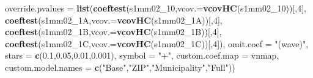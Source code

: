 \documentclass[
]{article}
\newenvironment{Shaded}{\begin{snugshade}}{\end{snugshade}}
\newcommand{\DataTypeTok}[1]{\textcolor[rgb]{0.13,0.29,0.53}{#1}}
\newcommand{\DecValTok}[1]{\textcolor[rgb]{0.00,0.00,0.81}{#1}}
\newcommand{\FloatTok}[1]{\textcolor[rgb]{0.00,0.00,0.81}{#1}}
\newcommand{\KeywordTok}[1]{\textcolor[rgb]{0.13,0.29,0.53}{\textbf{#1}}}
\newcommand{\NormalTok}[1]{#1}
\newcommand{\StringTok}[1]{\textcolor[rgb]{0.31,0.60,0.02}{#1}}
\begin{document}
\begin{Shaded}
\begin{Highlighting}[]
          \DataTypeTok{override.pvalues =} \KeywordTok{list}\NormalTok{(}\KeywordTok{coeftest}\NormalTok{(s1mm02_}\DecValTok{10}\NormalTok{,}\DataTypeTok{vcov.=}\KeywordTok{vcovHC}\NormalTok{(s1mm02_}\DecValTok{10}\NormalTok{))[,}\DecValTok{4}\NormalTok{],}
                                  \KeywordTok{coeftest}\NormalTok{(s1mm02_1A,}\DataTypeTok{vcov.=}\KeywordTok{vcovHC}\NormalTok{(s1mm02_1A))[,}\DecValTok{4}\NormalTok{],}
                                  \KeywordTok{coeftest}\NormalTok{(s1mm02_1B,}\DataTypeTok{vcov.=}\KeywordTok{vcovHC}\NormalTok{(s1mm02_1B))[,}\DecValTok{4}\NormalTok{],}
                                  \KeywordTok{coeftest}\NormalTok{(s1mm02_1C,}\DataTypeTok{vcov.=}\KeywordTok{vcovHC}\NormalTok{(s1mm02_1C))[,}\DecValTok{4}\NormalTok{]),}
          \DataTypeTok{omit.coef =} \StringTok{"(wave)"}\NormalTok{, }\DataTypeTok{stars =} \KeywordTok{c}\NormalTok{(}\FloatTok{0.1}\NormalTok{,}\FloatTok{0.05}\NormalTok{,}\FloatTok{0.01}\NormalTok{,}\FloatTok{0.001}\NormalTok{), }\DataTypeTok{symbol =} \StringTok{"+"}\NormalTok{,}
          \DataTypeTok{custom.coef.map =}\NormalTok{ vnmap, }
          \DataTypeTok{custom.model.names =} \KeywordTok{c}\NormalTok{(}\StringTok{"Base"}\NormalTok{,}\StringTok{"ZIP"}\NormalTok{,}\StringTok{"Municipality"}\NormalTok{,}\StringTok{"Full"}\NormalTok{))}
\end{Highlighting}
\end{Shaded}
\end{document}
